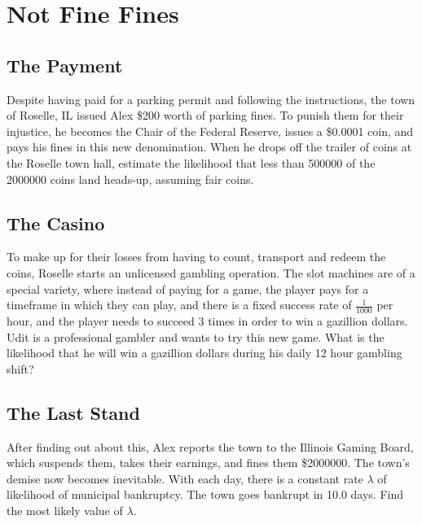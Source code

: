 \documentclass{exam}
\begin{document}
\section{Not Fine Fines}
\subsection{The Payment}
Despite having paid for a parking permit and following the instructions, the town of Roselle, IL issued Alex \$200 worth of parking fines. To punish them for their injustice, he becomes the Chair of the Federal Reserve, issues a \$0.0001 coin, and pays his fines in this new denomination. When he drops off the trailer of coins at the Roselle town hall, estimate the likelihood that less than 500000 of the 2000000 coins land heads-up, assuming fair coins. 
\vspace{4cm}

\subsection{The Casino}
To make up for their losses from having to count, transport and redeem the coins, Roselle starts an unlicensed gambling operation. The slot machines are of a special variety, where instead of paying for a game, the player pays for a timeframe in which they can play, and there is a fixed success rate of $\frac{1}{1000}$ per hour, and the player needs to succeed 3 times in order to win a gazillion dollars. Udit is a professional gambler and wants to try this new game. What is the likelihood that he will win a gazillion dollars during his daily 12 hour gambling shift?
\vspace{4cm}

\subsection{The Last Stand}
After finding out about this, Alex reports the town to the Illinois Gaming Board, which suspends them, takes their earnings, and fines them \$2000000. The town's demise now becomes inevitable. With each day, there is a constant rate $\lambda$ of likelihood of municipal bankruptcy. The town goes bankrupt in 10.0 days. Find the most likely value of $\lambda$. 
\vspace{4cm}

\end{document}
